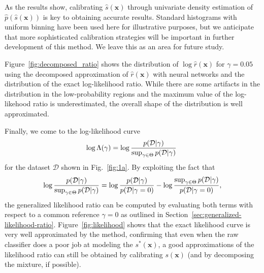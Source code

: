 \documentclass[12pt]{article}
\numberwithin{equation}{section}
\theoremstyle{plain}
\begin{document}
As the results show, calibrating $\hat s(\mathbf{x})$ through univariate density estimation of
$\hat p(\hat s(\mathbf{x}))$ is key to obtaining accurate results. Standard
histograms with uniform binning have been used here for illustrative purposes, but we
anticipate that more sophisticated calibration strategies will be important in further development
of this method. We leave this as an area for future study.

Figure~\ref{fig:decomposed_ratio} shows the distribution of $ \log \hat r(\mathbf{x})$ for $\gamma=0.05$
using the decomposed approximation of $\hat r(\mathbf{x})$ with neural networks and the distribution
of the exact log-likelihood ratio. While there are some artifacts in the distribution in the low-probability regions and the maximum value of the log-likehood ratio is underestimated, the overall shape of the distribution is well approximated.

Finally, we come to the log-likelihood curve
\begin{equation}
\log \Lambda( \gamma ) =  \log \frac{ p({\cal D} | \gamma ) }{ \sup_{\gamma \in \Theta} p({\cal D} | \gamma )} \;
\end{equation}
for the dataset $\mathcal{D}$ shown in  Fig.~\ref{fig:1a}.
By exploiting the fact that
\begin{equation}
\log \frac{ p({\cal D} | \gamma ) }{ \sup_{\gamma \in \Theta} p({\cal D} | \gamma )} = \log \frac{ p({\cal D} | \gamma ) }{ p({\cal D} | \gamma = 0 ) } - \log \frac{ \sup_{\gamma \in \Theta} p({\cal D} | \gamma) }{  p({\cal D} | \gamma = 0 ) },
\end{equation}
the generalized likelihood ratio can be computed by evaluating
both terms with respect to a common reference $\gamma=0$
as outlined in Section~\ref{sec:generalized-likelihood-ratio}.
Figure~\ref{fig:likelihood} shows that the exact likelihood curve is very well
approximated by the method, confirming that
even when the raw classifier does a poor job at modeling the $s^*(\mathbf{x})$, a good approximations of the
likelihood ratio can still be obtained by calibrating $s(\mathbf{x})$ (and by decomposing
the mixture, if possible).
\end{document}
